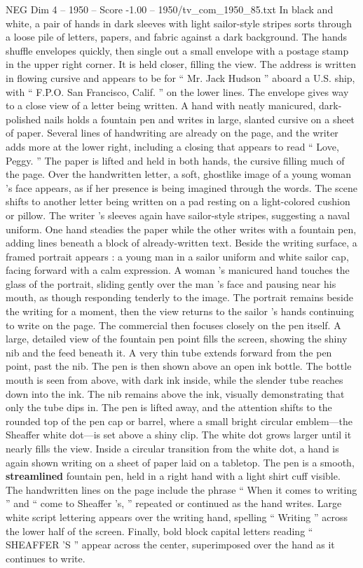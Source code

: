 \begin{textsample}{NEG Dim 4 – 1950 – Score -1.00 – 1950/tv\_com\_1950\_85.txt}  \label{ex:f4_neg_065}
In black and white, a pair of hands in dark sleeves with light sailor-style stripes sorts through a loose pile of letters, papers, and fabric against a dark background.
The hands shuffle envelopes quickly, then single out a small envelope with a postage stamp in the upper right corner.
It is held closer, filling the view.
The address is written in flowing cursive and appears to be for “ Mr.
Jack Hudson ” aboard a U.S. ship, with “ F.P.O.
San Francisco, Calif. ” on the lower lines.
The envelope gives way to a close view of a letter being written.
A hand with neatly manicured, dark-polished nails holds a fountain pen and writes in large, slanted cursive on a sheet of paper.
Several lines of handwriting are already on the page, and the writer adds more at the lower right, including a closing that appears to read “ Love, Peggy. ” The paper is lifted and held in both hands, the cursive filling much of the page.
Over the handwritten letter, a soft, ghostlike image of a young woman ’s face appears, as if her presence is being imagined through the words.
The scene shifts to another letter being written on a pad resting on a light-colored cushion or pillow.
The writer ’s sleeves again have sailor-style stripes, suggesting a naval uniform.
One hand steadies the paper while the other writes with a fountain pen, adding lines beneath a block of already-written text.
Beside the writing surface, a framed portrait appears : a young man in a sailor uniform and white sailor cap, facing forward with a calm expression.
A woman ’s manicured hand touches the glass of the portrait, sliding gently over the man ’s face and pausing near his mouth, as though responding tenderly to the image.
The portrait remains beside the writing for a moment, then the view returns to the sailor ’s hands continuing to write on the page.
The commercial then focuses closely on the pen itself.
A large, detailed view of the fountain pen point fills the screen, showing the shiny nib and the feed beneath it.
A very thin tube extends forward from the pen point, past the nib.
The pen is then shown above an open ink bottle.
The bottle mouth is seen from above, with dark ink inside, while the slender tube reaches down into the ink.
The nib remains above the ink, visually demonstrating that only the tube dips in.
The pen is lifted away, and the attention shifts to the rounded top of the pen cap or barrel, where a small bright circular emblem—the Sheaffer white dot—is set above a shiny clip.
The white dot grows larger until it nearly fills the view.
Inside a circular transition from the white dot, a hand is again shown writing on a sheet of paper laid on a tabletop.
The pen is a smooth, \textbf{streamlined} fountain pen, held in a right hand with a light shirt cuff visible.
The handwritten lines on the page include the phrase “ When it comes to writing ” and “ come to Sheaffer ’s, ” repeated or continued as the hand writes.
Large white script lettering appears over the writing hand, spelling “ Writing ” across the lower half of the screen.
Finally, bold block capital letters reading “ SHEAFFER ’S ” appear across the center, superimposed over the hand as it continues to write.

\end{textsample}
